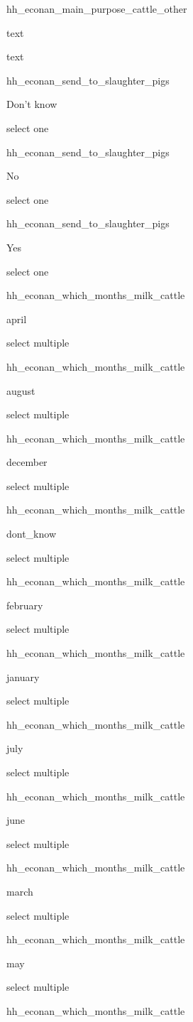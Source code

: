\documentclass[]{article}
\begin{document}
hh\_econan\_main\_purpose\_cattle\_other

text

text

hh\_econan\_send\_to\_slaughter\_pigs

Don't know

select one

hh\_econan\_send\_to\_slaughter\_pigs

No

select one

hh\_econan\_send\_to\_slaughter\_pigs

Yes

select one

hh\_econan\_which\_months\_milk\_cattle

april

select multiple

hh\_econan\_which\_months\_milk\_cattle

august

select multiple

hh\_econan\_which\_months\_milk\_cattle

december

select multiple

hh\_econan\_which\_months\_milk\_cattle

dont\_know

select multiple

hh\_econan\_which\_months\_milk\_cattle

february

select multiple

hh\_econan\_which\_months\_milk\_cattle

january

select multiple

hh\_econan\_which\_months\_milk\_cattle

july

select multiple

hh\_econan\_which\_months\_milk\_cattle

june

select multiple

hh\_econan\_which\_months\_milk\_cattle

march

select multiple

hh\_econan\_which\_months\_milk\_cattle

may

select multiple

hh\_econan\_which\_months\_milk\_cattle
\end{document}
